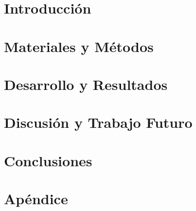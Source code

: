 \documentclass[11pt,a4paper,twoside]{tesis}
\begin{document}
\def\titulo{Licenciado}
\def\autor{Martín Ezequiel Langberg}
\def\tituloTesis{Predicción de patogenicidad en polimorfismos de un sólo nucleótido usando Aprendizaje Automático}
\def\runtitulo{Predicción de patogenicidad en polimorfismos de un sólo nucleótido usando aprendizaje automático}
\def\director{Ariel Berenstein}
\def\codirector{Pablo Turjanski}
\def\lugar{Buenos Aires, 2018}


\frontmatter
\pagestyle{plain}






\mainmatter
\pagestyle{headings}


\chapter{Introducción}
\label{ch:introduccion}


\chapter{Materiales y Métodos}
\label{ch:materiales}


\chapter{Desarrollo y Resultados}
\label{ch:desarrollo}


\chapter{Discusión y Trabajo Futuro}
\label{ch:discusion}


\chapter{Conclusiones}
\label{ch:conclusiones}


\chapter{Apéndice}
\label{ch:apendice}





\backmatter




\end{document}
